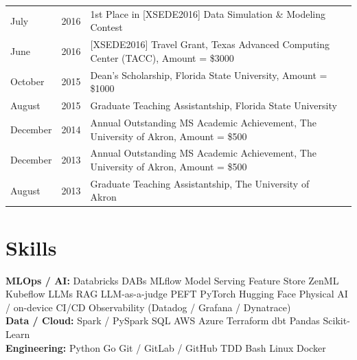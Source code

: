 \documentclass[]{template}
\begin{document}
\begin{tabular}{llll}
\textbullet{} July& 2016	  & 1st Place in [XSEDE2016] Data Simulation \& Modeling Contest  \\

\textbullet{} June & 2016	  & [XSEDE2016] Travel Grant, Texas Advanced Computing Center (TACC), Amount = \$3000\\

\textbullet{} October& 2015	  & Dean's Scholarship, Florida State University, Amount = \$1000\\

\textbullet{} August& 2015	 & Graduate Teaching Assistantship, Florida State University\\

\textbullet{} December& 2014	  & Annual Outstanding MS Academic Achievement, The University of Akron, Amount = \$500\\

\textbullet{} December& 2013	 & Annual Outstanding MS Academic Achievement, The University of Akron, Amount = \$500 \\

\textbullet{} August& 2013	 & Graduate Teaching Assistantship, The University of Akron

\end{tabular}
\sectionsep




\sectionsep
\hline
\sectionsep

\section{Skills}
\begin{minipage}[t]{\textwidth}
\textbf{MLOps / AI:} Databricks \textbullet{} DABs \textbullet{} MLflow \textbullet{} Model Serving \textbullet{} Feature Store \textbullet{} ZenML \textbullet{} Kubeflow \textbullet{} LLMs \textbullet{} RAG \textbullet{} LLM-as-a-judge \textbullet{} PEFT \textbullet{} PyTorch \textbullet{} Hugging Face \textbullet{} Physical AI / on-device \textbullet{} CI/CD \textbullet{} Observability (Datadog / Grafana / Dynatrace) \\
\textbf{Data / Cloud:} Spark / PySpark \textbullet{} SQL \textbullet{} AWS \textbullet{} Azure \textbullet{} Terraform \textbullet{} dbt \textbullet{} Pandas \textbullet{} Scikit-Learn \\
\textbf{Engineering:} Python \textbullet{} Go \textbullet{} Git / GitLab / GitHub \textbullet{} TDD \textbullet{} Bash \textbullet{} Linux \textbullet{} Docker
\sectionsep
\end{minipage}
\end{document}
